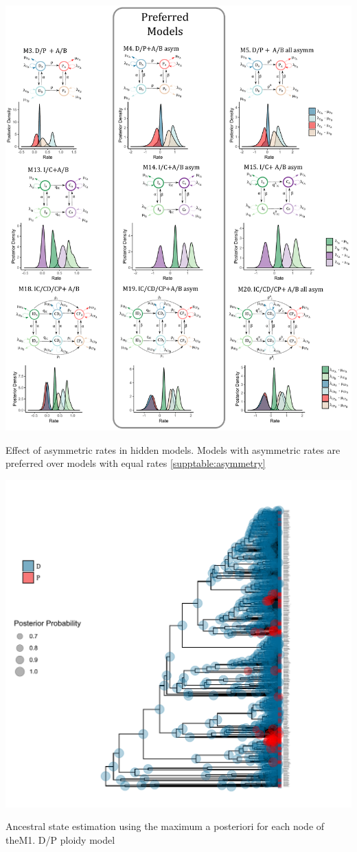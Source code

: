 \begin{suppfigure}
\includegraphics[width=\textwidth]{effectofasymmetry.pdf}
\caption{Effect of asymmetric rates in hidden models. Models with asymmetric rates are preferred over models with equal rates \cref{supptable:asymmetry}} %
\label{suppfigure:asymmetric}
\end{suppfigure}


\begin{suppfigure}
\includegraphics[width=\textwidth]{asrDP.pdf}
\caption{Ancestral state estimation using the maximum a posteriori for each node of theM1. D/P ploidy model} %
\label{suppfigure:DPnodipasr}
\end{suppfigure}

